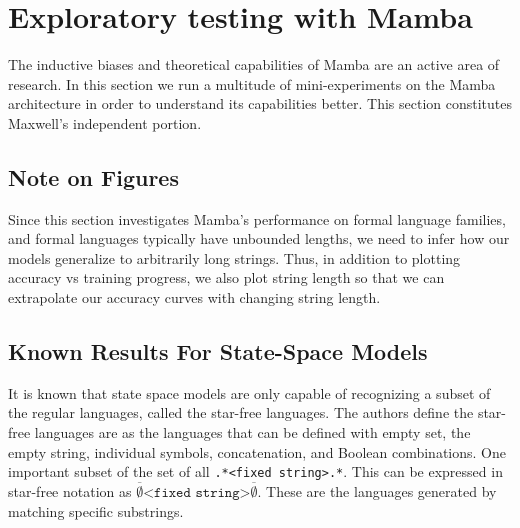 \section{Exploratory testing with Mamba}
The inductive biases and theoretical capabilities of Mamba are an active area of
research. In this section we run a multitude of mini-experiments on the Mamba
architecture in order to understand its capabilities better.
This section constitutes Maxwell's independent portion.

\subsection{Note on Figures}
Since this section investigates Mamba's performance on formal language families,
and formal languages typically have unbounded lengths, we need to infer how our
models generalize to arbitrarily long strings. Thus, in addition to plotting
accuracy vs training progress, we also plot string length so that we can
extrapolate our accuracy curves with changing string length.

\subsection{Known Results For State-Space Models}
It is known that state space models are only capable of recognizing a subset of
the regular languages\cite{ssmformal}, called the star-free languages.
The authors define the star-free languages are as the languages that can be
defined with empty set, the empty string, individual symbols, concatenation, and
Boolean combinations.
One important subset of the set of all \verb-.*<fixed string>.*-.
This can be expressed in star-free notation as
$\overline{\emptyset}\texttt{<fixed string>}\overline{\emptyset}$.
These are the languages generated by matching specific substrings.

